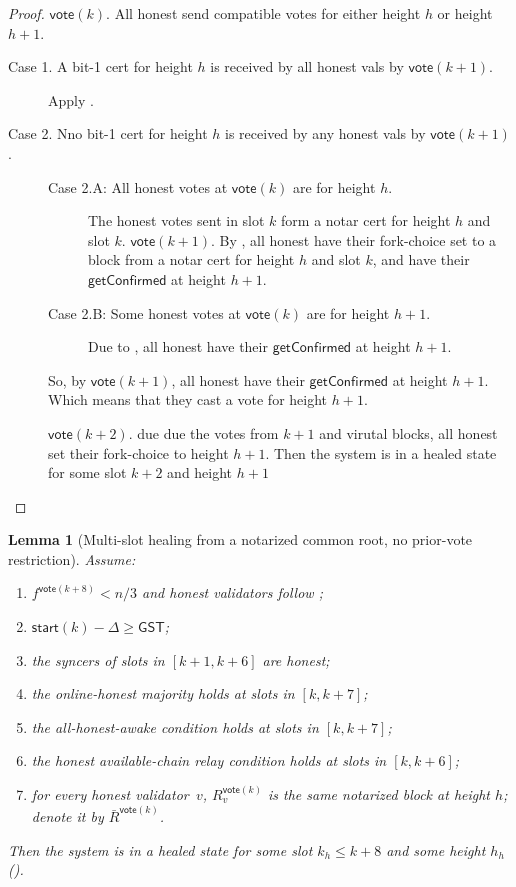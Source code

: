 \ifx\litemode\undefined\documentclass{article}\fi
\newcommand{\start}{\mathsf{start}}
\newcommand{\vote}{\mathsf{vote}}
\newcommand{\comm}[1]{\bar{#1}}
\newcommand{\getConfirmed}{\textsf{getConfirmed}\xspace}
\theoremstyle{plain}
\newtheorem{lemma}{Lemma}
\theoremstyle{definition}
\theoremstyle{remark}
\newcommand{\GST}{\ensuremath{\mathsf{GST}}}
\newcommand{\OHM}{online-honest majority\xspace}
\newcommand{\HAR}{honest available-chain relay\xspace}
\newcommand{\AHA}{all-honest-awake\xspace}
\begin{document}
\begin{proof}
{$\vote(k)$. All honest send compatible votes for either height $h$ or height $h+1$.

\begin{description}
  \item[Case 1. A bit-1 cert for height $h$ is received by all honest vals by $\vote(k+1)$.] 
  Apply .

  \item[Case 2. Nno bit-1 cert for height $h$ is received by any honest vals by $\vote(k+1)$.]\leavevmode
  \begin{description}
    \item[Case 2.A: All honest votes at $\vote(k)$ are for height $h$.]
    The honest votes sent in slot $k$ form a notar cert for height $h$ and slot $k$.
    $\vote(k+1)$. By , all honest have their fork-choice set to a  block from a notar cert for height $h$ and slot $k$, and have their $\getConfirmed$ at height $h+1$.

    \item[Case 2.B: Some honest votes at $\vote(k)$ are for height $h+1$.]
    Due to , all honest have their $\getConfirmed$ at height $h+1$. 
  \end{description}

  So, by $\vote(k+1)$,  all honest have their $\getConfirmed$ at height $h+1$. 
  Which means that they cast a vote for height $h+1$.

  $\vote(k+2)$. due due the votes from $k+1$ and virutal blocks, all honest set their fork-choice to height $h+1$.
  Then the system is in a healed state for some slot $k+2$ and height $h+1$ 

\end{description}}

\end{proof}
\begin{lemma}[Multi-slot healing from a notarized common root, no prior-vote restriction]\label{rev:lem:healing-from-notarized-multi-no-nh}
Assume:
\begin{enumerate}
  \item\label{rev:hfnmnn:f} $f^{\vote(k+8)} < n/3$ and honest validators follow ;
  \item\label{rev:hfnmnn:sync} $\start(k) - \Delta \geq \GST$;
  \item\label{rev:hfnmnn:syncers} the syncers of slots in $[k+1, k+6]$ are honest;
  \item\label{rev:hfnmnn:ohm} the \OHM holds at slots in $[k, k+7]$;
  \item\label{rev:hfnmnn:aha} the \AHA condition holds at slots in $[k, k+7]$;
  \item\label{rev:hfnmnn:har} the \HAR condition holds at slots in $[k, k+6]$;
  \item\label{rev:hfnmnn:r} for every honest validator~$v$, $R_v^{\vote(k)}$ is the same notarized block at height $h$; denote it by $\comm{R}^{\vote(k)}$.
\end{enumerate}
Then the system is in a healed state for some slot $k_h \leq k+8$ and some height $h_h$ ().
\end{lemma}
\end{document}
